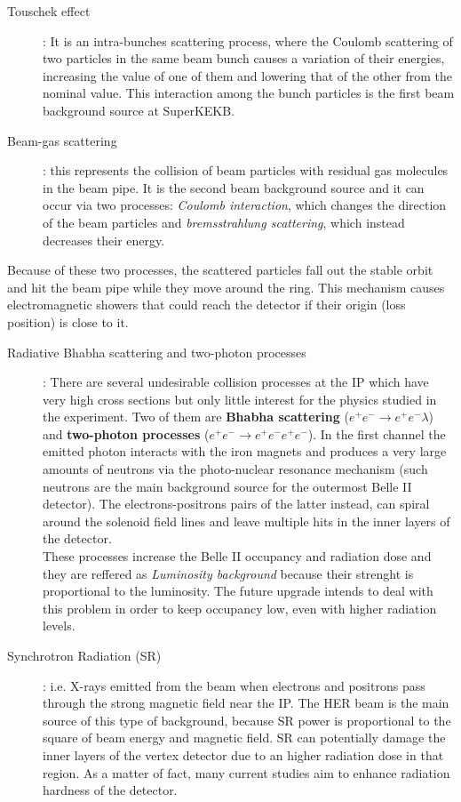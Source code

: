 \begin{description}
\item[Touschek effect]: 
	It is an intra-bunches scattering process, where the Coulomb scattering of two particles in the same beam bunch causes a variation of their energies, increasing the value of one of them and lowering that of the other from the nominal value. This interaction among the bunch particles is the first beam background source at SuperKEKB.
\item[Beam-gas scattering]: 
	this represents the collision of beam particles with residual gas molecules in the beam pipe. It is the second beam background source and it can occur via two processes: \emph{Coulomb interaction}, which changes the direction of the beam particles and \emph{bremsstrahlung scattering}, which instead decreases their energy. 
\end{description}
	
Because of these two processes, the scattered particles fall out the stable orbit and hit the beam pipe while they move around the ring. This mechanism causes electromagnetic showers that could reach the detector if their origin (loss position) is close to it.


\begin{description}
\item[Radiative Bhabha scattering and two-photon processes]:
	There are several undesirable collision processes at the IP which have very high cross sections but only little interest for the physics studied in the experiment. Two of them are \textbf{Bhabha scattering} ($e^{+}e^{-} \rightarrow e^{+}e^{-} \lambda$) and \textbf{two-photon processes} ($e^{+}e^{-} \rightarrow e^{+}e^{-}e^{+}e^{-} $). 
	In the first channel the emitted photon interacts with the iron magnets and produces a very large amounts of neutrons via the photo-nuclear resonance mechanism (such neutrons are the main background source for the outermost Belle II detector). The electrons-positrons pairs of the latter instead, can spiral around the solenoid field lines and leave multiple hits in the inner layers of the detector.\\
	
These processes increase the Belle II occupancy and radiation dose and they are reffered as \textit{Luminosity background} because their strenght is proportional to the luminosity. The future upgrade intends to deal with this problem in order to keep occupancy low, even with higher radiation levels.

\item[Synchrotron Radiation (SR)]:
	i.e. X-rays emitted from the beam when electrons and positrons pass through the strong magnetic field near the IP. The HER beam is the main source of this type of background, because SR power is proportional to the square of beam energy and magnetic field.
SR can potentially damage the inner layers of the vertex detector due to an higher radiation dose in that region. As a matter of fact, many current studies aim to enhance radiation hardness of the detector.
\end{description}


